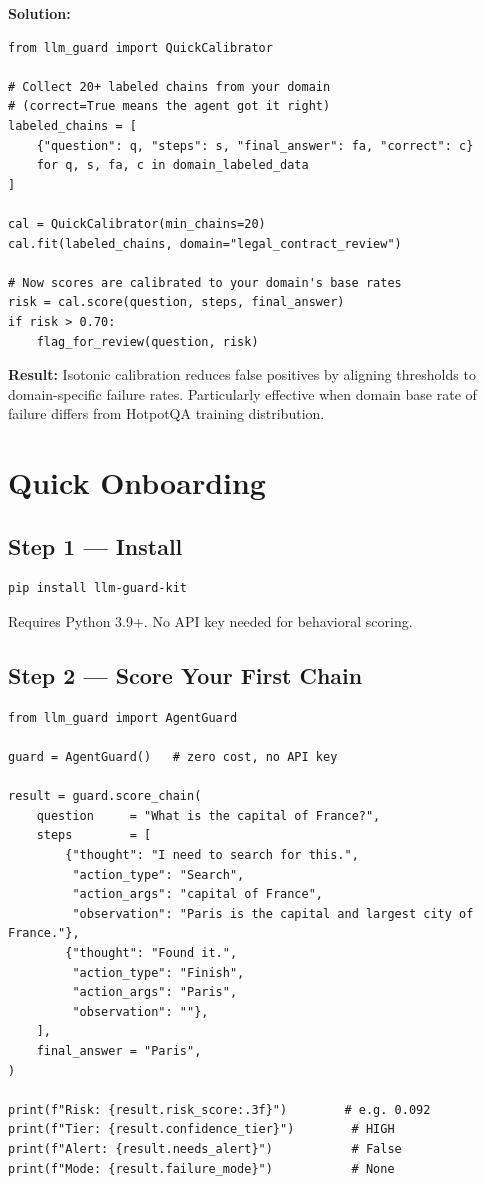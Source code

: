 \documentclass[11pt,a4paper]{article}
\begin{document}
\textbf{Solution:}

\begin{lstlisting}
from llm_guard import QuickCalibrator

# Collect 20+ labeled chains from your domain
# (correct=True means the agent got it right)
labeled_chains = [
    {"question": q, "steps": s, "final_answer": fa, "correct": c}
    for q, s, fa, c in domain_labeled_data
]

cal = QuickCalibrator(min_chains=20)
cal.fit(labeled_chains, domain="legal_contract_review")

# Now scores are calibrated to your domain's base rates
risk = cal.score(question, steps, final_answer)
if risk > 0.70:
    flag_for_review(question, risk)
\end{lstlisting}

\textbf{Result:} Isotonic calibration reduces false positives by
aligning thresholds to domain-specific failure rates.
Particularly effective when domain base rate of failure differs
from HotpotQA training distribution.

\section{Quick Onboarding}

\subsection*{Step 1 --- Install}

\begin{lstlisting}[language=bash,style=pythonstyle]
pip install llm-guard-kit
\end{lstlisting}

Requires Python 3.9+. No API key needed for behavioral scoring.

\subsection*{Step 2 --- Score Your First Chain}

\begin{lstlisting}
from llm_guard import AgentGuard

guard = AgentGuard()   # zero cost, no API key

result = guard.score_chain(
    question     = "What is the capital of France?",
    steps        = [
        {"thought": "I need to search for this.",
         "action_type": "Search",
         "action_args": "capital of France",
         "observation": "Paris is the capital and largest city of France."},
        {"thought": "Found it.",
         "action_type": "Finish",
         "action_args": "Paris",
         "observation": ""},
    ],
    final_answer = "Paris",
)

print(f"Risk: {result.risk_score:.3f}")        # e.g. 0.092
print(f"Tier: {result.confidence_tier}")        # HIGH
print(f"Alert: {result.needs_alert}")           # False
print(f"Mode: {result.failure_mode}")           # None
\end{lstlisting}
\end{document}
